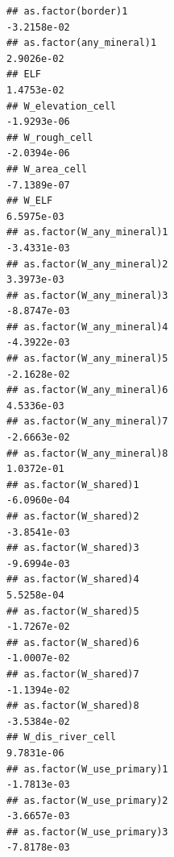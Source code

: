 \documentclass[
  a4paper,
]{article}
\begin{document}
\begin{verbatim}
## as.factor(border)1                                                                -3.2158e-02
## as.factor(any_mineral)1                                                            2.9026e-02
## ELF                                                                                1.4753e-02
## W_elevation_cell                                                                  -1.9293e-06
## W_rough_cell                                                                      -2.0394e-06
## W_area_cell                                                                       -7.1389e-07
## W_ELF                                                                              6.5975e-03
## as.factor(W_any_mineral)1                                                         -3.4331e-03
## as.factor(W_any_mineral)2                                                          3.3973e-03
## as.factor(W_any_mineral)3                                                         -8.8747e-03
## as.factor(W_any_mineral)4                                                         -4.3922e-03
## as.factor(W_any_mineral)5                                                         -2.1628e-02
## as.factor(W_any_mineral)6                                                          4.5336e-03
## as.factor(W_any_mineral)7                                                         -2.6663e-02
## as.factor(W_any_mineral)8                                                          1.0372e-01
## as.factor(W_shared)1                                                              -6.0960e-04
## as.factor(W_shared)2                                                              -3.8541e-03
## as.factor(W_shared)3                                                              -9.6994e-03
## as.factor(W_shared)4                                                               5.5258e-04
## as.factor(W_shared)5                                                              -1.7267e-02
## as.factor(W_shared)6                                                              -1.0007e-02
## as.factor(W_shared)7                                                              -1.1394e-02
## as.factor(W_shared)8                                                              -3.5384e-02
## W_dis_river_cell                                                                   9.7831e-06
## as.factor(W_use_primary)1                                                         -1.7813e-03
## as.factor(W_use_primary)2                                                         -3.6657e-03
## as.factor(W_use_primary)3                                                         -7.8178e-03

\end{verbatim}
\end{document}
